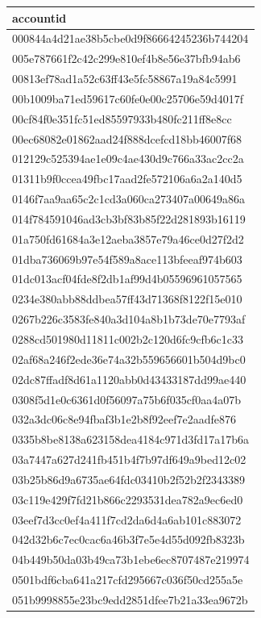 \begin{tabular}{l}
\toprule
accountid \\
\midrule
000844a4d21ae38b5cbe0d9f86664245236b744204 \\
005e787661f2c42c299e810ef4b8e56e37bfb94ab6 \\
00813ef78ad1a52c63ff43e5fc58867a19a84c5991 \\
00b1009ba71ed59617c60fe0e00c25706e59d4017f \\
00cf84f0e351fc51ed85597933b480fc211ff8e8cc \\
00ec68082e01862aad24f888dcefcd18bb46007f68 \\
012129c525394ae1e09c4ae430d9c766a33ac2cc2a \\
01311b9f0ccea49fbc17aad2fe572106a6a2a140d5 \\
0146f7aa9aa65c2c1cd3a060ca273407a00649a86a \\
014f784591046ad3cb3bf83b85f22d281893b16119 \\
01a750fd61684a3e12aeba3857e79a46ce0d27f2d2 \\
01dba736069b97e54f589a8ace113bfeeaf974b603 \\
01dc013acf04fde8f2db1af99d4b05596961057565 \\
0234e380abb88ddbea57ff43d71368f8122f15e010 \\
0267b226c3583fe840a3d104a8b1b73de70e7793af \\
0288cd501980d11811c002b2c120d6fc9cfb6c1c33 \\
02af68a246f2ede36e74a32b559656601b504d9bc0 \\
02dc87ffadf8d61a1120abb0d43433187dd99ae440 \\
0308f5d1e0c6361d0f56097a75b6f035cf0aa4a07b \\
032a3dc06c8e94fbaf3b1e2b8f92eef7e2aadfe876 \\
0335b8be8138a623158dea4184c971d3fd17a17b6a \\
03a7447a627d241fb451b4f7b97df649a9bed12c02 \\
03b25b86d9a6735ae64fdc03410b2f52b2f2343389 \\
03c119e429f7fd21b866c2293531dea782a9ec6ed0 \\
03eef7d3cc0ef4a411f7cd2da6d4a6ab101c883072 \\
042d32b6c7ec0cac6a46b3f7e5e4d55d092fb8323b \\
04b449b50da03b49ca73b1ebe6ec8707487e219974 \\
0501bdf6cba641a217cfd295667c036f50cd255a5e \\
051b9998855e23bc9edd2851dfee7b21a33ea9672b \\

\end{tabular}
